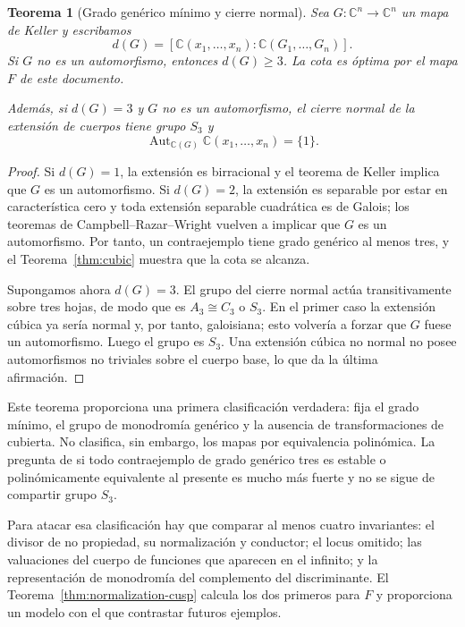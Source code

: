 \documentclass[11pt]{article}
\newtheorem{theorem}{Teorema}[section]
\theoremstyle{definition}
\theoremstyle{remark}
\newcommand{\C}{\mathbb{C}}
\begin{document}
\begin{theorem}[Grado gen\'erico m\'inimo y cierre normal]
\label{thm:generic-degree-three}
Sea $G\colon\C^n\to\C^n$ un mapa de Keller y escribamos
\[
d(G)=[\C(x_1,\ldots,x_n):\C(G_1,\ldots,G_n)].
\]
Si $G$ no es un automorfismo, entonces $d(G)\geq3$. La cota es \'optima por
el mapa $F$ de este documento.

Adem\'as, si $d(G)=3$ y $G$ no es un automorfismo, el cierre normal de la
extensi\'on de cuerpos tiene grupo $S_3$ y
\[
\operatorname{Aut}_{\C(G)}\C(x_1,\ldots,x_n)=\{1\}.
\]
\end{theorem}

\begin{proof}
Si $d(G)=1$, la extensi\'on es birracional y el teorema de Keller implica que
$G$ es un automorfismo. Si $d(G)=2$, la extensi\'on es separable por estar en
caracter\'istica cero y toda extensi\'on separable cuadr\'atica es de Galois;
los teoremas de Campbell--Razar--Wright vuelven a implicar que $G$ es un
automorfismo. Por tanto, un contraejemplo tiene grado gen\'erico al menos tres,
y el Teorema~\ref{thm:cubic} muestra que la cota se alcanza.

Supongamos ahora $d(G)=3$. El grupo del cierre normal act\'ua transitivamente
sobre tres hojas, de modo que es $A_3\cong C_3$ o $S_3$. En el primer caso la
extensi\'on c\'ubica ya ser\'ia normal y, por tanto, galoisiana; esto volver\'ia
a forzar que $G$ fuese un automorfismo. Luego el grupo es $S_3$. Una extensi\'on
c\'ubica no normal no posee automorfismos no triviales sobre el cuerpo base,
lo que da la \'ultima afirmaci\'on.
\end{proof}

Este teorema proporciona una primera clasificaci\'on verdadera: fija el grado
m\'inimo, el grupo de monodrom\'ia gen\'erico y la ausencia de transformaciones
de cubierta. No clasifica, sin embargo, los mapas por equivalencia polin\'omica.
La pregunta de si todo contraejemplo de grado gen\'erico tres es estable o
polin\'omicamente equivalente al presente es mucho m\'as fuerte y no se sigue
de compartir grupo $S_3$.

Para atacar esa clasificaci\'on hay que comparar al menos cuatro invariantes:
el divisor de no propiedad, su normalizaci\'on y conductor; el locus omitido;
las valuaciones del cuerpo de funciones que aparecen en el infinito; y la
representaci\'on de monodrom\'ia del complemento del discriminante. El
Teorema~\ref{thm:normalization-cusp} calcula los dos primeros para $F$ y
proporciona un modelo con el que contrastar futuros ejemplos.
\end{document}
